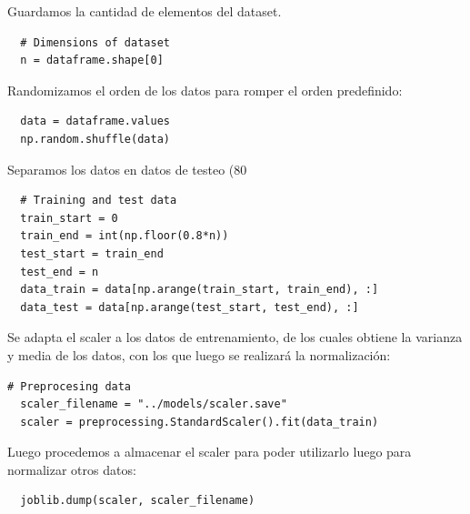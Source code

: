 \documentclass[osajnl,twocolumn,showpacs,superscriptaddress,10pt]{revtex4-1} %
\begin{document}
Guardamos la cantidad de elementos del dataset.

\begin{verbatim}
  # Dimensions of dataset
  n = dataframe.shape[0]
\end{verbatim}

Randomizamos el orden de los datos para romper el orden predefinido:

\begin{verbatim}
  data = dataframe.values
  np.random.shuffle(data)
\end{verbatim}

Separamos los datos en datos de testeo (80%

\begin{verbatim}
  # Training and test data
  train_start = 0
  train_end = int(np.floor(0.8*n))
  test_start = train_end
  test_end = n
  data_train = data[np.arange(train_start, train_end), :]
  data_test = data[np.arange(test_start, test_end), :]
\end{verbatim}

Se adapta el scaler a los datos de entrenamiento, de los cuales obtiene la varianza y media de los datos, con los que luego se realizará la normalización:

\begin{verbatim}
# Preprocesing data
  scaler_filename = "../models/scaler.save"
  scaler = preprocessing.StandardScaler().fit(data_train)
\end{verbatim}

Luego procedemos a almacenar el scaler para poder utilizarlo luego para normalizar otros datos:

\begin{verbatim}
  joblib.dump(scaler, scaler_filename)
\end{verbatim}
\end{document}

